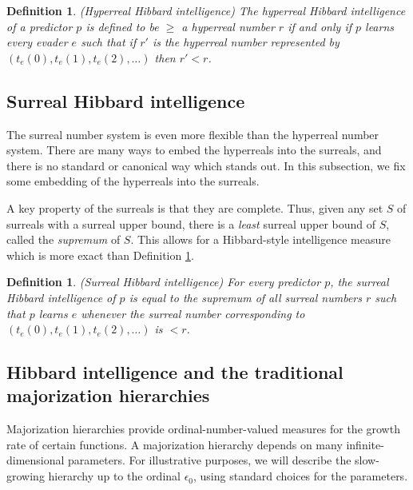 \documentclass{article}
\newtheorem{definition}[theorem]{Definition}
\begin{document}
\begin{definition}
\label{hyperrealhibbardintelligencedefn}
    (Hyperreal Hibbard intelligence)
    The \emph{hyperreal Hibbard intelligence} of a predictor $p$ is defined to be
    $\geq$ a hyperreal number $r$ if and only if $p$ learns every evader $e$
    such that if $r'$ is the hyperreal number represented by
    $(t_e(0), t_e(1), t_e(2), \ldots)$ then $r'<r$.
\end{definition}

\subsection{Surreal Hibbard intelligence}

The surreal number system is even
more flexible than the hyperreal number system.
There are many ways to embed the hyperreals into the surreals, and there is no
standard or canonical way which stands out. In this subsection, we fix some embedding
of the hyperreals into the surreals.

A key property of the surreals
is that they are complete. Thus, given any set $S$ of surreals with a surreal upper bound,
there is a \emph{least} surreal upper bound of $S$, called the \emph{supremum} of $S$.
This allows for a Hibbard-style intelligence measure which is more
exact than Definition \ref{hyperrealhibbardintelligencedefn}.

\begin{definition}
\label{surrealhibbardintelligencedefn}
    (Surreal Hibbard intelligence)
    For every predictor $p$, the \emph{surreal Hibbard intelligence} of $p$
    is equal to the supremum of all surreal numbers $r$ such that
    $p$ learns $e$ whenever the surreal number corresponding to
    $(t_e(0),t_e(1),t_e(2),\ldots)$ is $<r$.
\end{definition}

\subsection{Hibbard intelligence and the traditional majorization hierarchies}

Majorization hierarchies \cite{weiermann2002slow}
provide ordinal-number-valued measures for the growth
rate of certain functions. A majorization hierarchy depends
on many infinite-dimensional parameters. For illustrative purposes,
we will describe the slow-growing hierarchy up to the ordinal $\epsilon_0$,
using standard choices for the parameters.
\end{document}
